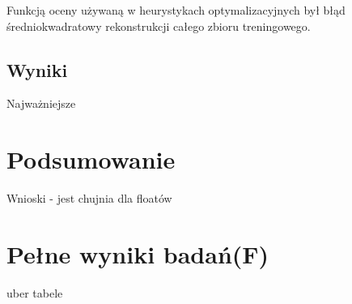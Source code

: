 \documentclass[11pt,a4paper,oneside]{report}
\begin{document}
Funkcją oceny używaną w heurystykach optymalizacyjnych był błąd średniokwadratowy rekonstrukcji całego zbioru treningowego.

\section{Wyniki}

Najważniejsze

\chapter{Podsumowanie}

Wnioski - jest chujnia dla floatów





\appendix 
\chapter{Pełne wyniki badań(F)}

uber tabele
\end{document}
